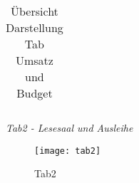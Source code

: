 \begin{table}[h]
\begin{adjustbox}{max width=\textwidth}
\begin{tabular}{p{}p{}p{}p{}p{}p{}}
        \bottomrule
        \end{tabular}
        \end{adjustbox}
        \caption{%
            Übersicht Darstellung Tab Umsatz und Budget
        }
        \label{tab:Darstellung Tab Umsatz und Budget}
        \end{table}
    \endgroup
    
    


        
    
        
    

\textit{Tab2 - Lesesaal und Ausleihe}

    \begin{figure}[H]
        \centering
            \texttt{[image: tab2]}
            \caption{Tab2}
            \label{fig:tab2}
    \end{figure}
    

